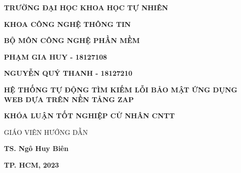 \begin{center}
    \centering

    \textbf{\textsf{\large TRƯỜNG ĐẠI HỌC KHOA HỌC TỰ NHIÊN }} 


    \textbf{\textsf{\large KHOA CÔNG NGHỆ THÔNG TIN }}
    

    \textbf{\textsf{\large BỘ MÔN CÔNG NGHỆ PHẦN MỀM }}
    
    \vspace{2.5cm}
    
    \textbf{\large PHẠM GIA HUY - 18127108}
    
    \vspace{0.25cm}

    \textbf{\large NGUYỄN QUÝ THANH - 18127210}
    
    \vspace{2.5cm}

    \textbf{\textsf{\LARGE HỆ THỐNG TỰ ĐỘNG TÌM KIẾM LỖI BẢO MẬT ỨNG DỤNG WEB DỰA TRÊN NỀN TẢNG ZAP }}
    
    \vspace{2cm}
    
    \textbf{\large KHÓA LUẬN TỐT NGHIỆP CỬ NHÂN CNTT }

    \vspace{2cm}

    \large GIÁO VIÊN HƯỚNG DẪN

    \vspace{0.25cm}

    \textbf{\textsf{\large TS. Ngô Huy Biên }}
    
    \vspace{2.5cm}
    
    \textbf{\large TP. HCM, 2023 }    
\end{center}